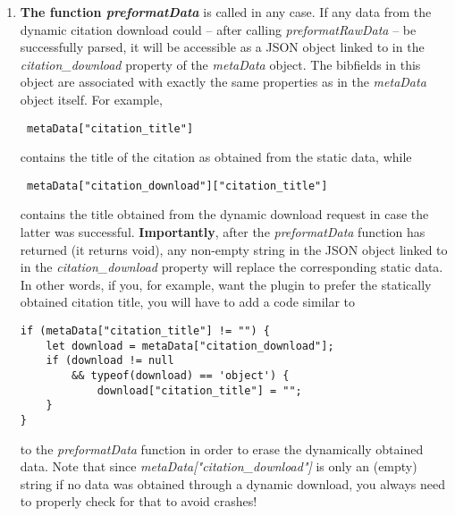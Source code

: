 \documentclass[
a4paper,
12pt,
]
{article}
\begin{document}
\begin{enumerate}
 \item \textbf{The function \textit{preformatData}} is called in any case. If any data from the dynamic citation download could -- after calling \textit{preformatRawData} -- be successfully parsed, it will be accessible as a JSON object linked to in the \textit{citation\_download} property of the \textit{metaData} object. The bibfields in this object are associated with exactly the same properties as in the \textit{metaData} object itself. For example,
 \begin{center}
\begin{lstlisting}
 metaData["citation_title"]
 \end{lstlisting}
\end{center}
contains the title of the citation as obtained from the static data, while
\begin{center}
\begin{lstlisting}
 metaData["citation_download"]["citation_title"]
 \end{lstlisting}
\end{center}
contains the title obtained from the dynamic download request in case the latter was successful. \textbf{Importantly}, after the \textit{preformatData} function has returned (it returns void), any non-empty string in the JSON object linked to in the \textit{citation\_download} property will replace the corresponding static data. In other words, if you, for example, want the plugin to prefer the statically obtained citation title, you will have to add a code similar to 
\begin{center}
\begin{lstlisting}
if (metaData["citation_title"] != "") {
	let download = metaData["citation_download"];
	if (download != null
		&& typeof(download) == 'object') {
		    download["citation_title"] = "";
	}	
}
\end{lstlisting}
\end{center}
to the \textit{preformatData} function in order to erase the dynamically obtained data. Note that since \textit{metaData["citation\_download"]} is only an (empty) string if no data was obtained through a dynamic download, you always need to properly check for that to avoid crashes!
\end{enumerate}
\end{document}
